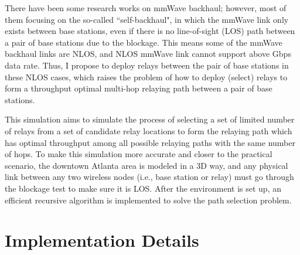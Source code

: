 \documentclass[paper=a4, fontsize=11pt]{scrartcl}
\numberwithin{equation}{section}		%
\numberwithin{figure}{section}			%
\numberwithin{table}{section}				%
\begin{document}
There have been some research works on mmWave backhaul; however, most of them focusing on the so-called ``self-backhaul", in which the mmWave link only exists between base stations, even if there is no line-of-sight (LOS) path between a pair of base stations due to the blockage. This means some of the mmWave backhaul links are NLOS, and NLOS mmWave link cannot support above Gbps data rate. Thus, I propose to deploy relays between the pair of base stations in these NLOS cases, which raises the problem of how to deploy (select) relays to form a throughput optimal multi-hop relaying path between a pair of base stations.

This simulation aims to simulate the process of selecting a set of limited number of relays from a set of candidate relay locations to form the relaying path which has optimal throughput among all possible relaying paths with the same number of hops. To make this simulation more accurate and closer to the practical scenario, the downtown Atlanta area is modeled in a 3D way, and any physical link between any two wireless nodes (i.e., base station or relay) must go through the blockage test to make sure it is LOS. After the environment is set up, an efficient recursive algorithm is implemented to solve the path selection problem.

\section{Implementation Details}
\end{document}
